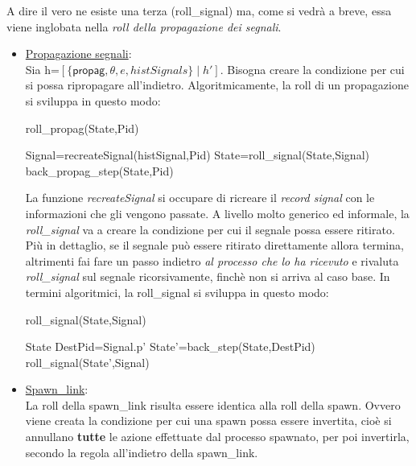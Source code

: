 \documentclass[Contributo.tex]{subfiles}
\begin{document}
	A dire il vero ne esiste una terza (roll\_signal) ma, come si vedrà a breve, essa viene inglobata nella \textit{roll della propagazione dei segnali}.
	\begin{itemize}
		\item \underline{Propagazione segnali}:\\
		Sia h=$\displaystyle [\{\mathsf{propag},\theta,e,histSignals\} \mid h']$.
		Bisogna creare la condizione per cui si possa ripropagare all'indietro.
		Algoritmicamente, la roll di un propagazione si sviluppa in questo modo:\\
		\begin{algorithm}[H]
		\caption{roll\_propag(State,Pid)}
		\begin{algorithmic}
			\STATE Signal=recreateSignal(histSignal,Pid)
			\STATE State=roll\_signal(State,Signal)
		\ENDFOR
		\RETURN back\_propag\_step(State,Pid)
		\end{algorithmic}
		\end{algorithm}
		La funzione \textit{recreateSignal} si occupare di ricreare il \textit{record signal} con le informazioni che gli vengono passate. 
		A livello molto generico ed informale, la \textit{roll\_signal} va a creare la condizione per cui il segnale possa essere ritirato.
		Più in dettaglio, se il segnale può essere ritirato direttamente allora termina, altrimenti fai fare un passo indietro \textit{al processo che lo ha ricevuto} e rivaluta \textit{roll\_signal} sul segnale ricorsivamente, finchè non si arriva al caso base.
		In termini algoritmici, la roll\_signal si sviluppa in questo modo:\\
		\begin{algorithm}[H]
		\caption{roll\_signal(State,Signal)}
		\begin{algorithmic}
		\IF {Signal $\in$ $\Psi$} 
			\RETURN State
		\ELSE
			\STATE DestPid=Signal.p'
			\STATE State'=back\_step(State,DestPid)
			\RETURN roll\_signal(State',Signal)
		\ENDIF
		\end{algorithmic}
		\end{algorithm}
		\item \underline{Spawn\_link}:\\
			La roll della spawn\_link risulta essere identica alla roll della spawn.
			Ovvero viene creata la condizione per cui una spawn possa essere invertita, cioè si annullano \textbf{tutte} le azione effettuate dal processo spawnato, per poi invertirla,
			secondo la regola all'indietro della spawn\_link.
	\end{itemize}
\end{document}
